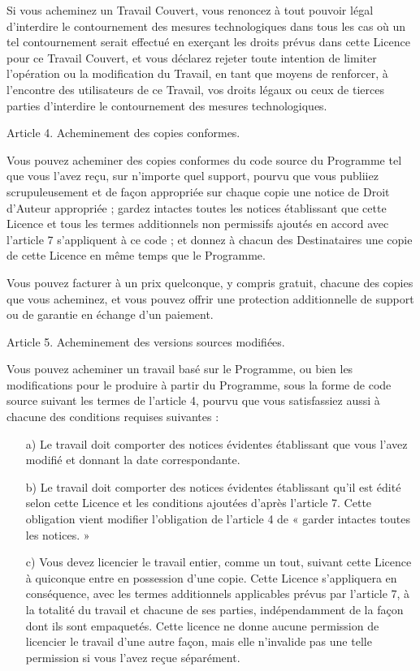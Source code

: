 {Si vous acheminez un Travail Couvert, vous renoncez à tout pouvoir légal
d’interdire le contournement des mesures technologiques dans tous les
cas où un tel contournement serait effectué en exerçant les droits
prévus dans cette Licence pour ce Travail Couvert, et vous déclarez
rejeter toute intention de limiter l’opération ou la modification du
Travail, en tant que moyens de renforcer, à l’encontre des utilisateurs
de ce Travail, vos droits légaux ou ceux de tierces parties d’interdire
le contournement des mesures technologiques.


Article 4. Acheminement des copies conformes.

Vous pouvez acheminer des copies conformes du code source du Programme
tel que vous l’avez reçu, sur n’importe quel support, pourvu que vous
publiiez scrupuleusement et de façon appropriée sur chaque copie une
notice de Droit d’Auteur appropriée ; gardez intactes toutes les
notices établissant que cette Licence et tous les termes additionnels non
permissifs ajoutés en accord avec l’article 7 s’appliquent à ce code ;
et donnez à chacun des Destinataires une copie de cette Licence en même
temps que le Programme.

Vous pouvez facturer à un prix quelconque, y compris gratuit, chacune
des copies que vous acheminez, et vous pouvez offrir une protection
additionnelle de support ou de garantie en échange d’un paiement.


Article 5. Acheminement des versions sources modifiées.

Vous pouvez acheminer un travail basé sur le Programme, ou bien les
modifications pour le produire à partir du Programme, sous la forme de
code source suivant les termes de l’article 4, pourvu que vous
satisfassiez aussi à chacune des conditions requises suivantes :
\begin{enumerate}
\item [a)] Le travail doit comporter des notices évidentes établissant que
     vous l’avez modifié et donnant la date correspondante.

\item [b)] Le travail doit comporter des notices évidentes établissant qu’il
     est édité selon cette Licence et les conditions ajoutées d’après
     l’article 7. Cette obligation vient modifier l’obligation de
     l’article 4 de « garder intactes toutes les notices. »

\item [c)] Vous devez licencier le travail entier, comme un tout, suivant
     cette Licence à quiconque entre en possession d’une copie. Cette
     Licence s’appliquera en conséquence, avec les termes additionnels
     applicables prévus par l’article 7, à la totalité du travail et
     chacune de ses parties, indépendamment de la façon dont ils sont
     empaquetés. Cette licence ne donne aucune permission de licencier
     le travail d’une autre façon, mais elle n’invalide pas une telle
     permission si vous l’avez reçue séparément.


\end{enumerate}}
